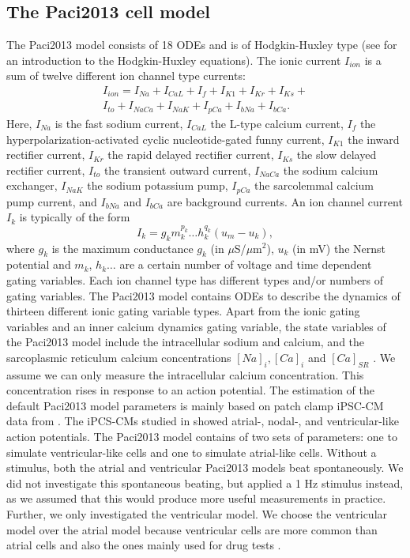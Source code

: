 \documentclass{article}
\begin{document}
\subsection{The Paci2013 cell model} \label{The Paci2013 cell model}
The Paci2013 model consists of 18 ODEs and is of Hodgkin-Huxley type (see \cite[p. 195-215]{KeenerI} for an introduction to the Hodgkin-Huxley equations). The ionic current $I_{ion}$ is a sum of twelve different ion channel type currents:
\begin{eqnarray}
I_{ion}=I_{Na}+I_{CaL}+I_f+I_{K1}+I_{Kr}+I_{Ks}+ \\
I_{to}+I_{NaCa}+I_{NaK}+I_{pCa}+I_{bNa}+I_{bCa}.
\end{eqnarray}
Here, $I_{Na}$ is the fast sodium current, $I_{CaL}$ the L-type calcium current, $I_f$ the hyperpolarization-activated cyclic nucleotide-gated funny current, $I_{K1}$ the inward rectifier current, $I_{Kr}$ the rapid delayed rectifier current, $I_{Ks}$ the slow delayed rectifier current, $I_{to}$ the transient outward current, $I_{NaCa}$ the sodium calcium exchanger, $I_{NaK}$ the sodium potassium pump, $I_{pCa}$ the sarcolemmal calcium pump current, and $I_{bNa}$ and $I_{bCa}$ are background currents.
An ion channel current $I_k$ is typically of the form 
\begin{equation}
I_{k}=g_k m_k^{p_k}\ldots h_k^{q_k}(u_m-u_k),
\end{equation}
where $g_k$ is the maximum conductance $g_k$ (in $\mu$S/$\mu$m$^2$), $u_k$ (in mV) the Nernst potential and $m_k$, $h_k \ldots$ are a certain number of voltage and time dependent gating variables. Each ion channel type has different types and/or numbers of gating variables. The Paci2013 model contains ODEs to describe the dynamics of thirteen different ionic gating variable types. Apart from the ionic gating variables and an inner calcium dynamics gating variable, the state variables of the Paci2013 model include the intracellular sodium and calcium, and the sarcoplasmic reticulum calcium concentrations $[Na]_i, [Ca]_i$ and $[Ca]_{SR}$ \cite{Paci2013}. We assume we can only measure the intracellular calcium concentration. This concentration rises in response to an action potential. The estimation of the default Paci2013 model parameters is mainly based on patch clamp iPSC-CM data from \cite{Ma2011}. The iPCS-CMs studied in \cite{Ma2011} showed atrial-, nodal-, and ventricular-like action potentials. The Paci2013 model contains of two sets of parameters: one to simulate ventricular-like cells and one to simulate atrial-like cells. Without a stimulus, both the atrial and ventricular Paci2013 models beat spontaneously. We did not investigate this spontaneous beating, but applied a 1 Hz stimulus instead, as we assumed that this would produce more useful measurements in practice. Further, we only investigated the ventricular model. We choose the ventricular model over the atrial model because ventricular cells are more common than atrial cells and also the ones mainly used for drug tests \cite{Paci2015}.
%
\end{document}
